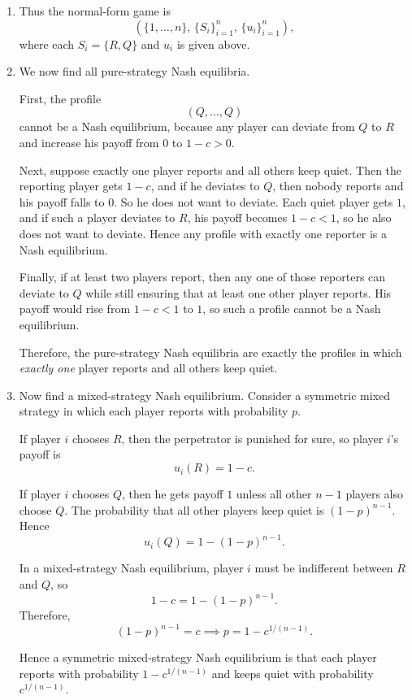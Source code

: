 \documentclass[12pt,a4paper]{article}
\begin{document}
\begin{enumerate}[label=(\alph*)]
  \item Thus the normal-form game is
  \[
  \left(\{1,\dots,n\},\,\{S_i\}_{i=1}^n,\,\{u_i\}_{i=1}^n\right),
  \]
  where each \(S_i=\{R,Q\}\) and \(u_i\) is given above.

  \item We now find all pure-strategy Nash equilibria.

  First, the profile
  \[
  (Q,\dots,Q)
  \]
  cannot be a Nash equilibrium, because any player can deviate from \(Q\) to \(R\) and increase his payoff from \(0\) to \(1-c>0\).

  Next, suppose exactly one player reports and all others keep quiet. Then the reporting player gets \(1-c\), and if he deviates to \(Q\), then nobody reports and his payoff falls to \(0\). So he does not want to deviate. Each quiet player gets \(1\), and if such a player deviates to \(R\), his payoff becomes \(1-c<1\), so he also does not want to deviate. Hence any profile with exactly one reporter is a Nash equilibrium.

  Finally, if at least two players report, then any one of those reporters can deviate to \(Q\) while still ensuring that at least one other player reports. His payoff would rise from \(1-c<1\) to \(1\), so such a profile cannot be a Nash equilibrium.

  Therefore, the pure-strategy Nash equilibria are exactly the profiles in which \emph{exactly one} player reports and all others keep quiet.

  \item Now find a mixed-strategy Nash equilibrium. Consider a symmetric mixed strategy in which each player reports with probability \(p\).

  If player \(i\) chooses \(R\), then the perpetrator is punished for sure, so player \(i\)'s payoff is
  \[
  u_i(R)=1-c.
  \]

  If player \(i\) chooses \(Q\), then he gets payoff \(1\) unless all other \(n-1\) players also choose \(Q\). The probability that all other players keep quiet is \((1-p)^{n-1}\).
  Hence
  \[
  u_i(Q)=1-(1-p)^{n-1}.
  \]

  In a mixed-strategy Nash equilibrium, player \(i\) must be indifferent between \(R\) and \(Q\), so
  \[
  1-c=1-(1-p)^{n-1}.
  \]
  Therefore,
  \[
  (1-p)^{n-1}=c \implies   p=1-c^{1/(n-1)}.
  \]

  Hence a symmetric mixed-strategy Nash equilibrium is that each player reports with probability \(1-c^{1/(n-1)}\) and keeps quiet with probability \(c^{1/(n-1)}\).
\end{enumerate}
\end{document}
